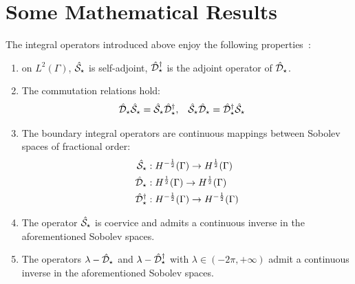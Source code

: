 \chapter{Some Mathematical Results}\label{app:mathematical-results}

\begin{lemma}
  The integral operators introduced above enjoy the following
  properties~\autocite{Hsiao2008-xb, Sauter2011-an}:
  \begin{enumerate}
      \item on $L^2(\Gamma)$, $\hat{\mathcal{S}}_\star$ is self-adjoint,
        $\hat{\mathcal{D}}^\dagger_\star$ is the adjoint operator of
        $\hat{\mathcal{D}}_\star$.
      \item The commutation relations hold:
        \begin{alignat}{2}
          \hat{\mathcal{D}}_\star\hat{\mathcal{S}}_\star = \hat{\mathcal{S}}_\star\hat{\mathcal{D}}^\dagger_\star, \quad&
          \hat{\mathcal{S}}_\star\hat{\mathcal{D}}_\star = \hat{\mathcal{D}}^\dagger_\star\hat{\mathcal{S}}_\star
        \end{alignat}
      \item The boundary integral operators are continuous
        mappings between Sobolev spaces of fractional order:
        \begin{subequations}
          \begin{align}
   \hat{\mathcal{S}}_\star &: H^{-\frac{1}{2}}(\Gamma) \rightarrow H^{\frac{1}{2}}(\Gamma) \\
   \hat{\mathcal{D}}_\star &: H^{\frac{1}{2}}(\Gamma) \rightarrow H^{\frac{1}{2}}(\Gamma) \\
   \hat{\mathcal{D}}^\dagger_\star &: H^{-\frac{1}{2}}(\Gamma) \rightarrow H^{-\frac{1}{2}}(\Gamma)
          \end{align}
        \end{subequations}
      \item The operator $\hat{\mathcal{S}}_\star$ is coervice and admits a
        continuous inverse in the aforementioned Sobolev spaces.
      \item The operators $\lambda - \hat{\mathcal{D}}_\star$ and $\lambda -
        \hat{\mathcal{D}}^\dagger_\star$ with $\lambda \in (-2\pi, +\infty)$
        admit a continuous inverse in the aforementioned
        Sobolev spaces.
  \end{enumerate}
\end{lemma}

